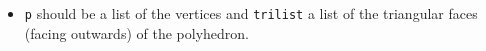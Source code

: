 \begin{itemize}
	\item \lstinline{p} should be a list of the vertices and \lstinline{trilist} a list of the triangular faces (facing outwards) of the polyhedron.
\end{itemize}